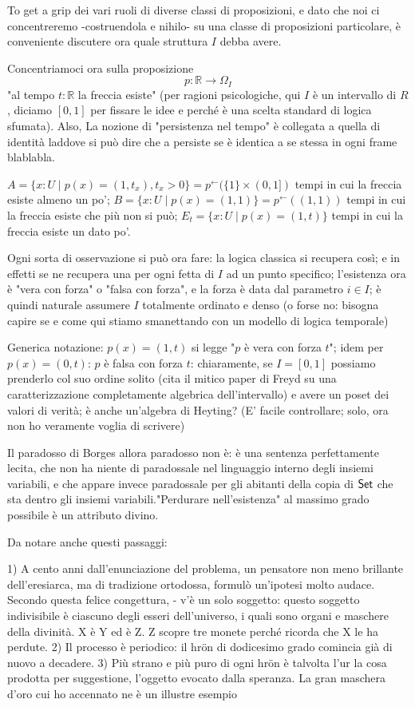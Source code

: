 \documentclass{amsart}
\begin{document}
To get a grip dei vari ruoli di diverse classi di proposizioni, e dato che noi ci concentreremo -costruendola e nihilo- su una classe di proposizioni particolare, è conveniente discutere ora quale struttura $I$ debba avere.


Concentriamoci ora sulla proposizione
\[p : \mathbb R \to \Omega_I\]
"al tempo $t : \mathbb R$ la freccia esiste" (per ragioni psicologiche, qui $I$ è un intervallo di $R$, diciamo $[0,1]$ per fissare le idee e perché è una scelta standard di logica sfumata). Also, La nozione di "persistenza nel tempo" è collegata a quella di identità laddove si può dire che a persiste se è identica a se stessa in ogni frame blablabla.

$A = \{x : U \mid p(x) = (1,t_x), t_x > 0\} = p^\leftarrow(\{1\}\times (0,1])$ tempi in cui la freccia esiste almeno un po';
$B = \{x : U \mid p(x) = (1,1)\} = p^\leftarrow((1,1))$ tempi in cui la freccia esiste che più non si può;
$E_t = \{ x : U \mid p(x)=(1,t)\}$ tempi in cui la freccia esiste un dato po'.

Ogni sorta di osservazione si può ora fare: la logica classica si recupera così; e in effetti se ne recupera una per ogni fetta di $I$ ad un punto specifico; l'esistenza ora è "vera con forza" o "falsa con forza", e la forza è data dal parametro $i\in I$; è quindi naturale assumere $I$ totalmente ordinato e denso (o forse no: bisogna capire se e come qui stiamo smanettando con un modello di logica temporale)

Generica notazione: $p(x)=(1,t)$ si legge "$p$ è vera con forza $t$"; idem per $p(x)=(0,t)$: $p$ è falsa con forza $t$: chiaramente, se $I=[0,1]$ possiamo prenderlo col suo ordine solito (cita il mitico paper di Freyd su una caratterizzazione completamente algebrica dell'intervallo) e avere un poset dei valori di verità; è anche un'algebra di Heyting? (E' facile controllare; solo, ora non ho veramente voglia di scrivere)

Il paradosso di Borges allora paradosso non è: è una sentenza perfettamente lecita, che non ha niente di paradossale nel linguaggio interno degli insiemi variabili, e che appare invece paradossale per gli abitanti della copia di $\mathsf{Set}$ che sta dentro gli insiemi variabili."Perdurare nell'esistenza" al massimo grado possibile è un attributo divino.

Da notare anche questi passaggi:

1) A cento anni dall’enunciazione del problema, un pensatore non meno brillante dell'eresiarca, ma di tradizione ortodossa, formulò un'ipotesi molto audace.  Secondo  questa  felice  congettura,  -  v'è  un solo  soggetto:  questo soggetto indivisibile è ciascuno degli esseri dell'universo, i quali sono organi e maschere della divinità. X è Y ed è Z. Z scopre tre monete perché ricorda che X le ha perdute.
2) Il processo è periodico: il hrön di dodicesimo grado comincia già di nuovo a decadere.
3) Più strano e più  puro di ogni hrön è talvolta l'ur la cosa prodotta per suggestione, l’oggetto evocato dalla speranza. La gran maschera d’oro cui ho accennato ne è un illustre esempio
\end{document}
